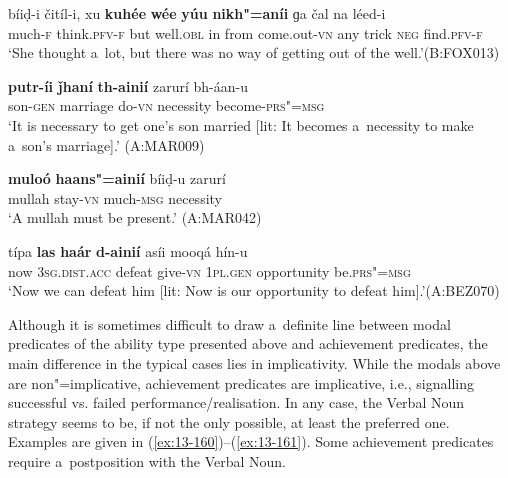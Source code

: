 \begin{exe}
\ex
\label{ex:13-156}
\gll bíiḍ-i čitíl-i, xu \textbf{kuhée} \textbf{wée} \textbf{yúu} \textbf{  nikh"=aníi} ɡa čal na léed-i  \\
much-\textsc{f} think.\textsc{pfv-f} but well.\textsc{obl} in from  come.out-\textsc{vn} any trick \textsc{neg} find.\textsc{pfv-f}  \\
\glt `She thought a~lot, but there was no way of getting out of the well.'\newline (B:FOX013)

\ex
\label{ex:13-157}
\gll \textbf{putr-íi} \textbf{ǰhaní} \textbf{th-ainií} zarurí bh-áan-u \\
son-\textsc{gen} marriage do-\textsc{vn} necessity become-\textsc{prs"=msg}  \\
\glt `It is necessary to get one's son married [lit: It becomes a~necessity to make a~son's marriage].' (A:MAR009)

\ex
\label{ex:13-158}
\gll \textbf{muloó} \textbf{haans"=ainií} bíiḍ-u zarurí \\
mullah stay-\textsc{vn}  much-\textsc{msg} necessity  \\
\glt `A mullah must be present.' (A:MAR042)

\ex
\label{ex:13-159}
\gll típa \textbf{las} \textbf{haár} \textbf{d-ainií} asíi mooqá  hín-u \\
now \textsc{3sg.dist.acc} defeat give-\textsc{vn} \textsc{1pl.gen} opportunity be.\textsc{prs"=msg}  \\
\glt `Now we can defeat him [lit: Now is our opportunity to defeat him].'\newline (A:BEZ070) 
\end{exe}

 Although it is sometimes difficult to draw a~definite line between modal predicates of the ability type presented above and achievement predicates, the main difference in the typical cases lies in implicativity. While the modals above are non"=implicative, achievement predicates are implicative, i.e., signalling successful vs. failed performance/realisation. In any case, the Verbal Noun strategy seems to be, if not the only possible, at least the preferred one. Examples are given in (\ref{ex:13-160})--(\ref{ex:13-161}). Some achievement predicates require a~postposition with the Verbal Noun.

